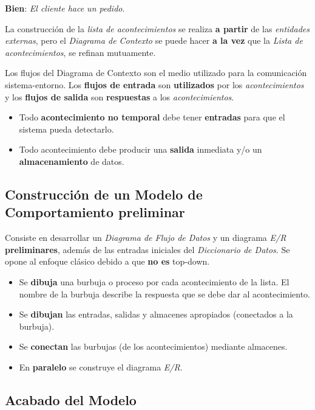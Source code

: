 \textbf{Bien}: \textit{El cliente hace un pedido}.

La construcción de la \textit{lista de acontecimientos} se realiza \textbf{a partir} de las \textit{entidades externas}, pero el \textit{Diagrama de Contexto} se puede hacer \textbf{a la vez} que la \textit{Lista de acontecimientos}, se refinan mutuamente.

Los flujos del Diagrama de Contexto son el medio utilizado para la comunicación sistema-entorno. Los \textbf{flujos de entrada} son \textbf{utilizados} por los \textit{acontecimientos} y los \textbf{flujos de salida} son \textbf{respuestas} a los \textit{acontecimientos}.

\begin{itemize}[noitemsep]
\item Todo \textbf{acontecimiento no temporal} debe tener \textbf{entradas} para que el sistema pueda detectarlo.
\item Todo acontecimiento debe producir una \textbf{salida} inmediata y/o un \textbf{almacenamiento} de datos.
\end{itemize}


\subsection{Construcción de un Modelo de Comportamiento preliminar} %

Consiste en desarrollar un \textit{Diagrama de Flujo de Datos} y un diagrama \textit{E/R} \textbf{preliminares}, además de las entradas iniciales del \textit{Diccionario de Datos}. Se opone al enfoque clásico debido a que \textbf{no es} top-down.

\begin{itemize}[noitemsep]
\item Se \textbf{dibuja} una burbuja o proceso por cada acontecimiento de la lista. El nombre de la burbuja describe la respuesta que se debe dar al acontecimiento.
\item Se \textbf{dibujan} las entradas, salidas y almacenes apropiados (conectados a la burbuja).
\item Se \textbf{conectan} las burbujas (de los acontecimientos) mediante almacenes.
\item En \textbf{paralelo} se construye el diagrama \textit{E/R}.
\end{itemize}


\subsection{Acabado del Modelo}

